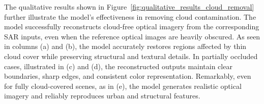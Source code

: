 The qualitative results shown in Figure~\ref{fig:qualitative_results_cloud_removal} further illustrate the model’s effectiveness in removing cloud contamination. The model successfully reconstructs cloud-free optical imagery from the corresponding SAR inputs, even when the reference optical images are heavily obscured. As seen in columns (a) and (b), the model accurately restores regions affected by thin cloud cover while preserving structural and textural details. In partially occluded cases, illustrated in (c) and (d), the reconstructed outputs maintain clear boundaries, sharp edges, and consistent color representation. Remarkably, even for fully cloud-covered scenes, as in (e), the model generates realistic optical imagery and reliably reproduces urban and structural features.

\begin{figure}[h!]
    \centering
    \setlength{\tabcolsep}{2pt} %
    \renewcommand{\arraystretch}{1.0} %


\end{figure}
